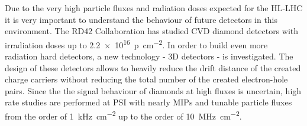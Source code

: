 Due to the very high particle fluxes and radiation doses expected for the \ac{HL-LHC} it is very important to understand the behaviour of future detectors in this environment. The RD42 Collaboration has studied \ac{CVD} diamond detectors with irradiation doses up to \SI{2.2e16}{p\per\centi\meter^2}. In order to build even more radiation hard detectors, a new technology - 3D detectors \cite{3D} - is investigated. The design of these detectors allows to heavily reduce the drift distance of the created charge carriers without reducing the total number of the created electron-hole pairs. Since the the signal behaviour of diamonds at high fluxes is uncertain, high rate studies are performed at \ac{PSI} with nearly \acp{MIP} and tunable particle fluxes from the order of \SI{1}{\kilo\hertz\per cm^2} up to the order of \SI{10}{\mega\hertz\per cm^2}.